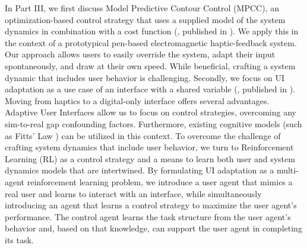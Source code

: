 In Part III, we first discuss Model Predictive Contour Control (MPCC), an optimization-based control strategy that uses a supplied model of the system dynamics in combination with a cost function (, published in \cite{langerak2020magpen}). We apply this in the context of a prototypical pen-based electromagnetic haptic-feedback system. Our approach allows users to easily override the system, adapt their input spontaneously, and draw at their own speed. While beneficial, crafting a system dynamic that includes user behavior is challenging. Secondly, we focus on UI adaptation as a use case of an interface with a shared variable (, published in \cite{Langerak:2024:MARLUI}). Moving from haptics to a digital-only interface offers several advantages. Adaptive User Interfaces allow us to focus on control strategies, overcoming any sim-to-real gap confounding factors. Furthermore, existing cognitive models (such as Fitts' Law \cite{fitts1954information}) can be utilized in this context. To overcome the challenge of crafting system dynamics that include user behavior, we turn to Reinforcement Learning (RL) as a control strategy and a means to learn both user and system dynamics models that are intertwined. By formulating UI adaptation as a multi-agent reinforcement learning problem, we introduce a user agent that mimics a real user and learns to interact with an interface, while simultaneously introducing an agent that learns a control strategy to maximize the user agent's performance. The control agent learns the task structure from the user agent's behavior and, based on that knowledge, can support the user agent in completing its task.
